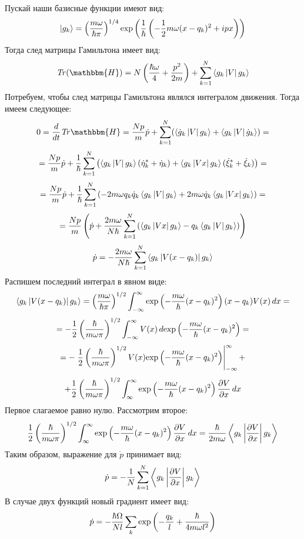 Пускай наши базисные функции имеют вид:
$$|g_k\rangle = \left(\frac{m\omega}{\hbar\pi}\right)^{1/4}%
		\myexp{\frac{1}{\hbar}\left(-\frac{1}{2}m\omega (x-q_k)^2 + ipx \right)}$$
Тогда след матрицы Гамильтона имеет вид:
$$\mathit{Tr}(\mathbbm{H}) = N \left( \frac{\hbar\omega}{4} + \frac{p^2}{2m} \right) + %
			     \sum_{k=1}^N \mymean{g_k}{V}{g_k}$$
Потребуем, чтобы след матрицы Гамильтона являлся интегралом движения. Тогда имеем следующее:
$$0=\frac{d}{dt}\mathit{Tr}{\mathbbm{H}}=%
   \frac{Np}{m}\dot{p}+\sum_{k=1}^N(\mymean{\dot{g}_k}{V}{g_k}+\mymean{g_k}{V}{\dot{g}_k})=$$
$$=\frac{Np}{m}\dot{p}+\frac{1}{\hbar}%
		       \sum_{k=1}^N\left(\mymean{g_k}{V}{g_k}(\dot{\eta}_k^*+\dot{\eta}_k)+%
					\mymean{g_k}{Vx}{g_k}(\dot{\xi}_k^*+\dot{\xi}_k)\right)=$$
$$=\frac{Np}{m}\dot{p}+\frac{1}{\hbar}%
		       \sum_{k=1}^N\left(-2m\omega q_k\dot{q}_k\mymean{g_k}{V}{g_k}+%
					2m\omega\dot{q}_k\mymean{g_k}{Vx}{g_k}\right)=$$
$$=\frac{Np}{m}\left(\dot{p}+\frac{2m\omega}{N\hbar}%
			     \sum_{k=1}^N\left(\mymean{g_k}{Vx}{g_k}-%
					       q_k\mymean{g_k}{V}{g_k}\right)%
	       \right)$$
$$\dot{p}=-\frac{2m\omega}{N\hbar}\sum_{k=1}^N\left\langle g_k \left| V(x-q_k) \right| g_k \right\rangle$$
Распишем последний интеграл в явном виде:
$$\mymean{g_k}{V(x-q_k)}{g_k}=%
  \left(\frac{m\omega}{\hbar\pi}\right)^{1/2}\int_{-\infty}^{\infty}%
  \myexp{-\frac{m\omega}{\hbar}(x-q_k)^2}(x-q_k)V(x)\,dx=$$
$$=-\frac{1}{2}\left(\frac{\hbar}{m\omega\pi}\right)^{1/2}\int_{-\infty}^{\infty}V(x)\,d\text{exp}\left( -\frac{m\omega}{\hbar}(x-q_k)^2 \right)=$$
$$=-\left.\frac{1}{2}\left(\frac{\hbar}{m\omega\pi}\right)^{1/2}V(x)\text{exp}\left( -\frac{m\omega}{\hbar}(x-q_k)^2 \right)\right|_{-\infty}^{\infty}+$$
$$+\frac{1}{2}\left(\frac{\hbar}{m\omega\pi}\right)^{1/2}%
   \int_{\infty}^{\infty}%
   \myexp{-\frac{m\omega}{\hbar}(x-q_k)^2}%
   \frac{\partial V}{\partial x}\,dx$$
Первое слагаемое равно нулю. Рассмотрим второе:
$$\frac{1}{2}\left(\frac{\hbar}{m\omega\pi}\right)^{1/2}%
  \int_{\infty}^{\infty}%
  \myexp{-\frac{m\omega}{\hbar}(x-q_k)^2}%
  \frac{\partial V}{\partial x}\,dx=\frac{\hbar}{2m\omega}\mymean{g_k}{\frac{\partial V}{\partial x}}{g_k}$$
Таким образом, выражение для $\dot{p}$ принимает вид:
$$\dot{p} = -\frac{1}{N}\sum_{k=1}^N\left\langle g_k \left| \frac{\partial V}{\partial x} \right| g_k \right\rangle$$
В случае двух функций новый градиент имеет вид:
$$\dot{p}=-\frac{\hbar\Omega}{Nl}\sum_k\text{exp}\left( -\frac{q_k}{l}+\frac{\hbar}{4m\omega l^2} \right)$$
